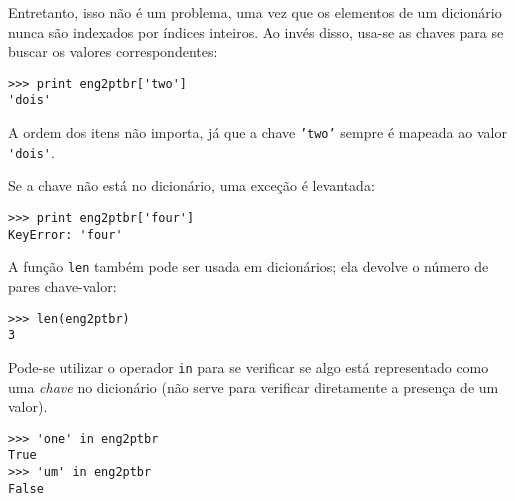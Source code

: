 Entretanto, isso não é um problema, uma vez que os elementos de um dicionário
nunca são indexados por índices inteiros. Ao invés disso, usa-se as chaves para
se buscar os valores correspondentes:

\beforeverb
\begin{verbatim}
>>> print eng2ptbr['two']
'dois'
\end{verbatim}
\afterverb
%

A ordem dos itens não importa, já que a chave {\tt 'two'} sempre é mapeada ao valor \verb"'dois'".

Se a chave não está no dicionário, uma exceção é levantada:


\beforeverb
\begin{verbatim}
>>> print eng2ptbr['four']
KeyError: 'four'
\end{verbatim}
\afterverb
%

A função {\tt len} também pode ser usada em dicionários; ela devolve
o número de pares chave-valor:


\beforeverb
\begin{verbatim}
>>> len(eng2ptbr)
3
\end{verbatim}
\afterverb
%

Pode-se utilizar o operador {\tt in} para se verificar se algo está representado
como uma \emph{chave} no dicionário (não serve para verificar diretamente
a presença de um valor).


\beforeverb
\begin{verbatim}
>>> 'one' in eng2ptbr
True
>>> 'um' in eng2ptbr
False
\end{verbatim}
\afterverb
%

